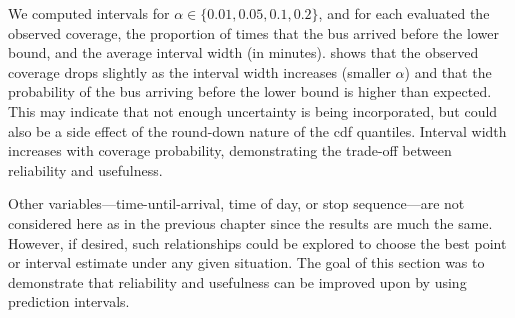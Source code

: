 We computed intervals for $\alpha \in \{0.01, 0.05, 0.1, 0.2\}$, and for each evaluated the observed coverage, the proportion of times that the bus arrived before the lower bound, and the average interval width (in minutes).  shows that the observed coverage drops slightly as the interval width increases (smaller $\alpha$) and that the probability of the bus arriving before the lower bound is higher than expected. This may indicate that not enough uncertainty is being incorporated, but could also be a side effect of the round-down nature of the \gls{cdf} quantiles. Interval width increases with coverage probability, demonstrating the trade-off between reliability and usefulness.


Other variables---time-until-arrival, time of day, or stop sequence---are not considered here as in the previous chapter since the results are much the same. However, if desired, such relationships could be explored to choose the best point or interval estimate under any given situation. The goal of this section was to demonstrate that reliability and usefulness can be improved upon by using prediction intervals.
